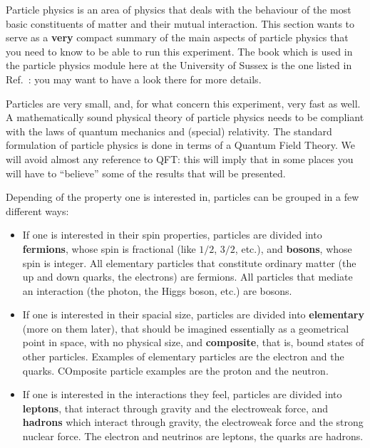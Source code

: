 

Particle physics is an area of physics that deals with the behaviour of the most basic constituents of matter and their mutual interaction. This section wants to serve as a \textbf{very} compact summary of the main aspects of particle physics that you need to know to be able to run this experiment. The book which is used in the particle physics module here at the University of Sussex is the one listed in Ref.~\cite{shaw}: you may want to have a look there for more details. 

Particles are very small, and, for what concern this experiment, very fast as well. A mathematically sound physical theory of particle physics needs to be compliant with the laws of quantum mechanics and (special) relativity. The standard formulation of particle physics is done in terms of a Quantum Field Theory. We will avoid almost any reference to QFT: this will imply that in some places you will have to ``believe'' some of the results that will be presented. 

Depending of the property one is interested in, particles can be grouped in a few different ways:

\begin{itemize}
\item If one is interested in their spin properties, particles are divided into \textbf{fermions}, whose spin is fractional (like $1/2$, $3/2$, etc.), and \textbf{bosons}, whose spin is integer. All elementary particles that constitute ordinary matter (the up and down quarks, the electrons) are fermions. All particles that mediate an interaction (the photon, the Higgs boson, etc.) are bosons.
\item If one is interested in their spacial size, particles are divided into \textbf{elementary} (more on them later), that should be imagined essentially as a geometrical point in space, with no physical size, and \textbf{composite}, that is, bound states of other particles. Examples of elementary particles are the electron and the quarks. COmposite particle examples are the proton and the neutron. 
\item If one is interested in the interactions they feel, particles are divided into \textbf{leptons}, that interact through gravity and the electroweak force, and \textbf{hadrons} which interact through gravity, the electroweak force and the strong nuclear force. The electron and neutrinos are leptons, the quarks are hadrons.
\end{itemize}

